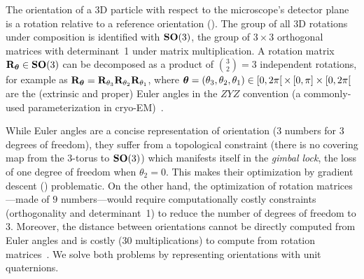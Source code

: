The orientation of a 3D particle with respect to the microscope's detector plane is a rotation relative to a reference orientation ().
The group of all 3D rotations under composition is identified with $\mathrm{\mathbf{SO}}(3)$, the group of $3 \times 3$ orthogonal matrices with determinant~1 under matrix multiplication.
A rotation matrix $\mathbf{R}_{{\boldsymbol{\theta}}} \in \mathrm{\mathbf{SO}}(3)$ can be decomposed as a product of $\binom{3}{2}=3$ independent rotations, for example as $\mathbf{R}_{{\boldsymbol{\theta}}} = \mathbf{R}_{\theta_3} \mathbf{R}_{\theta_2} \mathbf{R}_{\theta_1}$, where ${\boldsymbol{\theta}} = (\theta_3,\theta_2,\theta_1) \in [0,2\pi[ \, \times \, [0,\pi] \times [0,2\pi[$ are the (extrinsic and proper) Euler angles in the $ZYZ$ convention (a commonly-used parameterization in cryo-EM)~\cite{sorzano2014interchanging}.

While Euler angles are a concise representation of orientation ($3$ numbers for $3$ degrees of freedom), they suffer from a topological constraint (there is no covering map from the $3$-torus to $\mathrm{\mathbf{SO}}(3)$) which manifests itself in the \textit{gimbal lock}, the loss of one degree of freedom when $\theta_2=0$. %
This makes their optimization by gradient descent () problematic.
On the other hand, the optimization of rotation matrices---made of $9$ numbers---would require computationally costly constraints (orthogonality and determinant~1) to reduce the number of degrees of freedom to $3$.
Moreover, the distance between orientations cannot be directly computed from Euler angles and is costly (30 multiplications) to compute from rotation matrices~\cite{huynh2009metrics}.
We solve both problems by representing orientations with unit quaternions.

